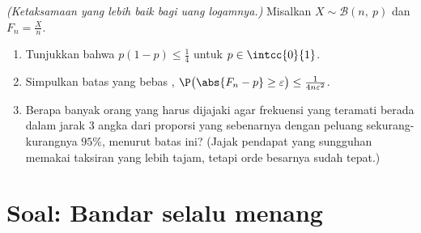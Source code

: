 \begin{exercise}[$\star\star\star$]\label{exo:g12:sums:8}
\emph{(Ketaksamaan yang lebih baik bagi uang logamnya.)} Misalkan
$X \sim \mathcal B(n,\ p)$ dan $F_n = \frac Xn$.
\begin{enumerate}
  \item Tunjukkan bahwa $p(1-p) \leq \frac14$ untuk $p \in \intcc{0}{1}$.
  \item Simpulkan batas yang bebas ,
        $\P\bigl(\abs{F_n - p} \geq \varepsilon\bigr) \leq
        \frac{1}{4n\varepsilon^2}$.
  \item Berapa banyak orang yang harus dijajaki agar frekuensi yang teramati berada
        dalam jarak $3$ angka dari proporsi yang sebenarnya dengan peluang sekurang-kurangnya
        $95\%$, menurut batas ini? (Jajak pendapat yang sungguhan memakai taksiran yang lebih tajam, tetapi
        orde besarnya sudah tepat.)
\end{enumerate}
\end{exercise}

\section{Soal: Bandar selalu menang}

